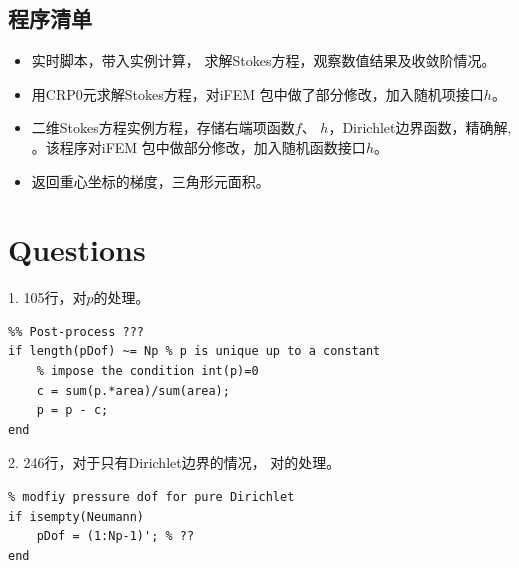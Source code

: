 \documentclass{ctexart}
\begin{document}
\subsection{程序清单}
\begin{itemize}
    \item {} 
    
    实时脚本，带入实例计算，
    求解Stokes方程，观察数值结果及收敛阶情况。
    
    \item {} 
    
    用CRP0元求解Stokes方程，对iFEM\cite{iFEM}
    包中做了部分修改，加入随机项接口$h$。
    
    \item {} 
    
    二维Stokes方程实例方程，存储右端项函数$f$、
    $h$，Dirichlet边界函数，精确解,
    。该程序对iFEM\cite{iFEM}
    包中做部分修改，加入随机函数接口$h$。

    \item {}
    
    返回重心坐标的梯度，三角形元面积。
\end{itemize}

\section{Questions}
1. 105行，对$p$的处理。
\begin{lstlisting}
%% Post-process ???
if length(pDof) ~= Np % p is unique up to a constant
    % impose the condition int(p)=0
    c = sum(p.*area)/sum(area);
    p = p - c;
end
\end{lstlisting}

2. 246行，对于只有Dirichlet边界的情况，
对的处理。
\begin{lstlisting}
% modfiy pressure dof for pure Dirichlet
if isempty(Neumann)
    pDof = (1:Np-1)'; % ??
end
\end{lstlisting}

\renewcommand\refname{参考文献}
\nocite{*} %
\printbibliography[heading=bibliography,title=参考文献]
\end{document}
